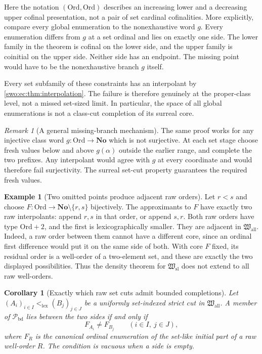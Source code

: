 \documentclass[11pt]{article}
\newtheorem{corollary}[corollary]{Corollary}
\theoremstyle{definition}
\newtheorem{example}[example]{Example}
\theoremstyle{remark}
\newtheorem{remark}[remark]{Remark}
\newcommand{\No}{\mathbf{No}}
\newcommand{\Ord}{\mathrm{Ord}}
\newcommand{\Hsl}{\mathfrak W_{\mathrm{sl}}}
\newcommand{\Hall}{\mathfrak W_{\mathrm{all}}}
\newcommand{\Pbd}{\mathcal P_{\mathrm{bd}}}
\newcommand{\lex}{\mathrm{lex}}
\begin{document}
Here the notation $(\Ord,\Ord)$ describes an increasing lower and a
decreasing upper cofinal presentation, not a pair of set cardinal
cofinalities. More explicitly, compare every global enumeration to the
nonexhaustive word $g$. Every enumeration differs from $g$ at a set
ordinal and lies on exactly one side. The lower family in the theorem
is cofinal on the lower side, and the upper family is coinitial on the
upper side. Neither side has an endpoint. The missing point would have
to be the nonexhaustive branch $g$ itself.

Every set subfamily of these constraints has an interpolant by
\cref{swo:ec:thm:interpolation}. The failure is therefore genuinely at the
proper-class level, not a missed set-sized limit. In particular, the
space of all global enumerations is not a class-cut completion of its
surreal core.

\begin{remark}[A general missing-branch mechanism]\label{swo:ec:n11.2}
The same proof works for any injective class word $g:\Ord\to\No$ which
is not surjective. At each set stage choose fresh values below and above
$g(\alpha)$ outside the earlier range, and complete the two prefixes.
Any interpolant would agree with $g$ at every coordinate and would
therefore fail surjectivity. The surreal set-cut property guarantees
the required fresh values.
\end{remark}

\begin{example}[Two omitted points produce adjacent raw orders]
\label{swo:gl:omitted-two}
Let $r<s$ and choose $F:\Ord\to\No\setminus\{r,s\}$ bijectively.  The
approximants to $F$ have exactly two raw interpolants: append $r,s$ in that
order, or append $s,r$.  Both raw orders have type $\Ord+2$, and the first
is lexicographically smaller.  They are adjacent in $\Hall$.  Indeed, a raw
order between them cannot have a different core, since an ordinal first
difference would put it on the same side of both.  With core $F$ fixed, its
residual order is a well-order of a two-element set, and these are exactly
the two displayed possibilities.  Thus the density theorem for $\Hsl$
does not extend to all raw well-orders.
\end{example}

\begin{corollary}[Exactly which raw set cuts admit bounded completions]
\label{swo:gl:raw-cut}
Let $(A_i)_{i\in I}<_{\lex}(B_j)_{j\in J}$ be a uniformly set-indexed
strict cut in $\Hall$.  A member of $\Pbd$ lies between the two sides if
and only if
\[
 F_{A_i}\ne F_{B_j}\qquad(i\in I,\ j\in J),
\]
where $F_R$ is the canonical ordinal enumeration of the set-like initial
part of a raw well-order $R$.  The condition is vacuous when a side is empty.
\end{corollary}
\end{document}
